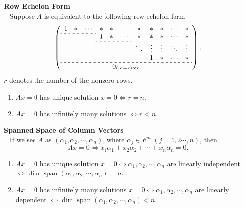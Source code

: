 \documentclass{report}
\theoremstyle{nonumberplain}
\begin{document}
\noindent\textbf{Row Echelon Form}\\~
Suppose $A$ is equivalent to the following row echelon form
\[
	\left(\begin{array}{ccccccccccc}
			1                              & *                                     & \cdots & *      & * & \cdots & *      & *      & *      & \cdots & *      \\\cdashline{1-3}[3pt/3pt]
			\multicolumn{3}{c;{3pt/3pt}}{} & 1                                     & *      & \cdots & * & *      & *      & \cdots & *                        \\\cdashline{4-6}[3pt/3pt]
			                               &                                       &        &        &   &        & \ddots & \vdots & \vdots & \ddots & \vdots \\
			\multicolumn{7}{c;{3pt/3pt}}{} & 1                                     & *      & \cdots & *                                                       \\\hdashline[3pt/3pt]
			                               & \multicolumn{9}{c}{0_{(m-r)\times n}} &
		\end{array}\right).
\]
$r$ denotes the number of the nonzero rows.
\begin{enumerate}
	\item $Ax=0$ has unique solution $x=0\iff r=n$.
	\item $Ax=0$ has infinitely many solutions $\iff r<n$.
\end{enumerate}

\noindent\textbf{Spanned Space of Column Vectors}\\~
If we see $A$ as $(\alpha_1,\alpha_2,\cdots,\alpha_n)$, where $\alpha_j\in F^m\;(j=1,2\cdots,n)$, then
\[
	Ax=0\iff x_1\alpha_1+x_2\alpha_2+\cdots+x_n\alpha_n=0.
\]
\begin{enumerate}
	\item $Ax=0$ has unique solution $x=0\iff \alpha_1,\alpha_2,\cdots,\alpha_n$ are linearly independent $\iff\dim\operatorname{span}(\alpha_1,\alpha_2,\cdots,\alpha_n)=n$.
	\item $Ax=0$ has infinitely many solutions $x=0\iff \alpha_1,\alpha_2,\cdots,\alpha_n$ are linearly dependent $\iff\dim\operatorname{span}(\alpha_1,\alpha_2,\cdots,\alpha_n)<n$.
\end{enumerate}
\end{document}
